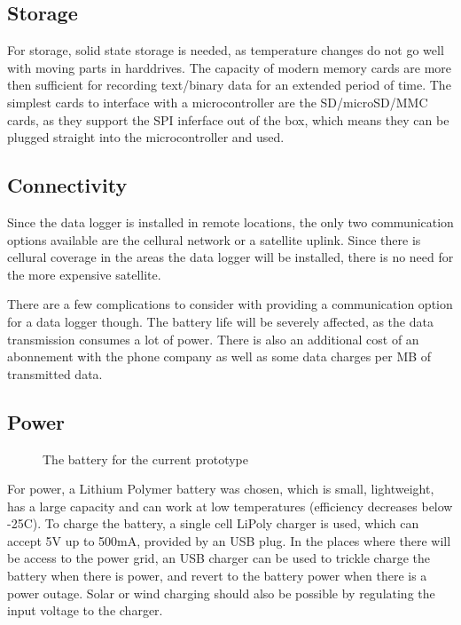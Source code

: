 \documentclass{project}
\begin{document}
\subsection{Storage}
For storage, solid state storage is needed, as temperature changes do not go well with moving parts in harddrives. The capacity of modern memory cards are more then sufficient for recording text/binary data for an extended period of time. The simplest cards to interface with a microcontroller are the SD/microSD/MMC cards, as they support the SPI inferface out of the box, which means they can be plugged straight into the microcontroller and used. 
\subsection{Connectivity}
Since the data logger is installed in remote locations, the only two communication options available are the cellural network or a satellite uplink. Since there is cellural coverage in the areas the data logger will be installed, there is no need for the more expensive satellite. 

There are a few complications to consider with providing a communication option for a data logger though. The battery life will be severely affected, as the data transmission consumes a lot of power. There is also an additional cost of an abonnement with the phone company as well as some data charges per MB of transmitted data.  

\subsection{Power}
\begin{figure}[!ht]
\centering
{}
\caption{The battery for the current prototype}
\label{nanortalik}
\end{figure}

For power, a Lithium Polymer battery was chosen, which is small, lightweight, has a large capacity and can work at low temperatures (efficiency decreases below -25C). 
To charge the battery, a single cell LiPoly charger is used, which can accept 5V up to 500mA, provided by an USB plug. In the places where there will be access to the power grid, an USB charger can be used to trickle charge the battery when there is power, and revert to the battery power when there is a power outage. 
Solar or wind charging should also be possible by regulating the input voltage to the charger.
\end{document}
